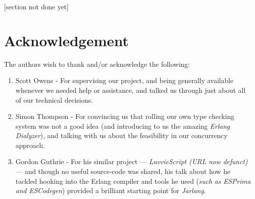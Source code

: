 \documentclass[twoside,12pt,titlepage,a4paper]{article}
\begin{document}
[section not done yet]

\section{Acknowledgement}
The authors wish to thank and/or acknowledge the following:
\begin{enumerate}
\item Scott Owens - For supervising our project, and being generally available whenever we needed help or assistance, and talked us through just about all of our technical decisions.
\item Simon Thompson - For convincing us that rolling our own type checking system was not a good idea (and introducing to us the amazing \textit{Erlang Dialyzer}), and talking with us about the feasibility in our concurrency approach.
\item Gordon Guthrie - For his similar project --- \textit{LuvvieScript (URL now defunct)} --- and though no useful source-code was shared, his talk about how he tackled hooking into the Erlang compiler and tools he used (\textit{such as ESPrima and ESCodegen}) provided a brilliant starting point for \textit{Jarlang}.
\end{enumerate}
\appendix
\end{document}
